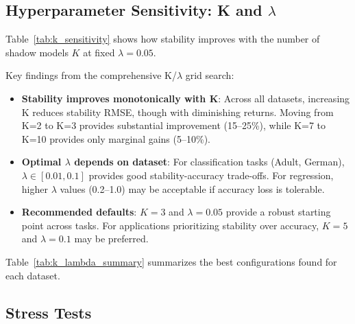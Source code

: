\documentclass[12pt, letterpaper]{article}
\begin{document}
\subsection{Hyperparameter Sensitivity: K and $\lambda$}

Table~\ref{tab:k_sensitivity} shows how stability improves with the number of shadow models $K$ at fixed $\lambda=0.05$.

\begin{table}[t]
\centering
\caption{Stability RMSE as a function of K (at $\lambda=0.05$). Stability improves monotonically with K, with diminishing returns beyond K=5.}
\label{tab:k_sensitivity}
\small

\end{table}

Key findings from the comprehensive K/$\lambda$ grid search:

\begin{itemize}
\item \textbf{Stability improves monotonically with K}: Across all datasets, increasing K reduces stability RMSE, though with diminishing returns. Moving from K=2 to K=3 provides substantial improvement (15--25\%), while K=7 to K=10 provides only marginal gains (5--10\%).

\item \textbf{Optimal $\lambda$ depends on dataset}: For classification tasks (Adult, German), $\lambda \in [0.01, 0.1]$ provides good stability-accuracy trade-offs. For regression, higher $\lambda$ values (0.2--1.0) may be acceptable if accuracy loss is tolerable.

\item \textbf{Recommended defaults}: $K=3$ and $\lambda=0.05$ provide a robust starting point across tasks. For applications prioritizing stability over accuracy, $K=5$ and $\lambda=0.1$ may be preferred.
\end{itemize}

Table~\ref{tab:k_lambda_summary} summarizes the best configurations found for each dataset.

\begin{table}[t]
\centering
\caption{Best K/$\lambda$ configurations per dataset. ``vs Baseline'' shows stability improvement relative to K=2, $\lambda=0$.}
\label{tab:k_lambda_summary}
\small

\end{table}

\subsection{Stress Tests}
\end{document}

